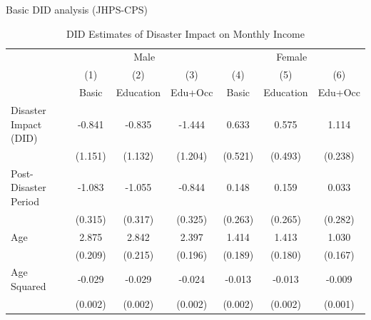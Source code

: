 \documentclass[serif, aspectratio=169]{beamer}
\begin{document}

\begin{frame}

Basic DID analysis (JHPS-CPS)

\vspace{-0.3cm}

\begin{table}[htbp]
\centering
\caption{DID Estimates of Disaster Impact on Monthly Income}

\begin{tabular}{@{}l*{6}{c}@{}}
          &\multicolumn{3}{c}{Male}                                &\multicolumn{3}{c}{Female}                              \\\cmidrule(lr){2-4}\cmidrule(lr){5-7}
          &\multicolumn{1}{c}{(1)}&\multicolumn{1}{c}{(2)}&\multicolumn{1}{c}{(3)}&\multicolumn{1}{c}{(4)}&\multicolumn{1}{c}{(5)}&\multicolumn{1}{c}{(6)}\\
          &\multicolumn{1}{c}{Basic}&\multicolumn{1}{c}{Education}&\multicolumn{1}{c}{Edu+Occ}&\multicolumn{1}{c}{Basic}&\multicolumn{1}{c}{Education}&\multicolumn{1}{c}{Edu+Occ}\\
\toprule
Disaster Impact (DID)&   -0.841         &   -0.835         &   -1.444         &    0.633         &    0.575         &    1.114\sym{***}\\
          &  (1.151)         &  (1.132)         &  (1.204)         &  (0.521)         &  (0.493)         &  (0.238)         \\
\addlinespace
Post-Disaster Period&   -1.083\sym{***}&   -1.055\sym{***}&   -0.844\sym{**} &    0.148         &    0.159         &    0.033         \\
          &  (0.315)         &  (0.317)         &  (0.325)         &  (0.263)         &  (0.265)         &  (0.282)         \\
\addlinespace
Age       &    2.875\sym{***}&    2.842\sym{***}&    2.397\sym{***}&    1.414\sym{***}&    1.413\sym{***}&    1.030\sym{***}\\
          &  (0.209)         &  (0.215)         &  (0.196)         &  (0.189)         &  (0.180)         &  (0.167)         \\
\addlinespace
Age Squared&   -0.029\sym{***}&   -0.029\sym{***}&   -0.024\sym{***}&   -0.013\sym{***}&   -0.013\sym{***}&   -0.009\sym{***}\\
          &  (0.002)         &  (0.002)         &  (0.002)         &  (0.002)         &  (0.002)         &  (0.001)         \\

\end{tabular}
\end{table}
\end{frame}
\end{document}
